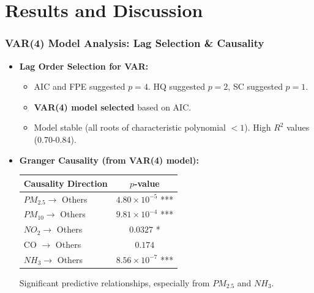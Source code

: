 \documentclass[svgnames, 12pt]{beamer}
\begin{document}
\section{Results and Discussion}
\begin{frame}
    \frametitle{VAR(4) Model Analysis: Lag Selection & Causality}
    \begin{itemize}
        \item \textbf{Lag Order Selection for VAR:}
            \begin{itemize}
                \item AIC and FPE suggested $p=4$. HQ suggested $p=2$, SC suggested $p=1$.
                \item \textbf{VAR(4) model selected} based on AIC.
                \item Model stable (all roots of characteristic polynomial $<1$). High $R^2$ values (0.70-0.84).
            \end{itemize}
        \item \textbf{Granger Causality (from VAR(4) model):}
            \begin{center}
            \footnotesize
            \begin{tabular}{lc}
                \toprule
                Causality Direction & $p$-value \\
                \midrule
                $PM_{2.5} \rightarrow$ Others & $4.80 \times 10^{-5}$ *** \\
                $PM_{10} \rightarrow$ Others & $9.81 \times 10^{-4}$ *** \\
                $NO_{2} \rightarrow$ Others & $0.0327$ * \\
                CO $\rightarrow$ Others & $0.174$ \\
                $NH_{3} \rightarrow$ Others & $8.56 \times 10^{-7}$ *** \\
                \bottomrule
            \end{tabular}
            \end{center}
            \vspace{0.2cm}
            \rightarrow Significant predictive relationships, especially from $PM_{2.5}$ and $NH_3$.
    \end{itemize}
\end{frame}
\end{document}
